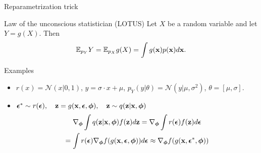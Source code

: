 \begin{frame}{Reparametrization trick}
	\begin{block}{Law of the unconscious statistician (LOTUS)}
		Let $X$ be a random variable and let $Y=g(X)$. Then
		\[
			\mathbb{E}_{p_Y} Y = \mathbb{E}_{p_X} g(X) = \int g(\mathbf{x}) p(\mathbf{x}) d \mathbf{x}.
		\]
		\vspace{-0.3cm}
	\end{block}
	\begin{block}{Examples} 
		\begin{itemize}
		\item $r(x) = \mathcal{N}(x|0, 1)$, $y = \sigma \cdot x + \mu$, $p_Y(y|\theta) = \mathcal{N}(y| \mu, \sigma^2)$, $\theta = [\mu, \sigma]$.

		\item $\boldsymbol{\epsilon}^* \sim r(\boldsymbol{\epsilon}), \quad \mathbf{z} = g(\mathbf{x}, \boldsymbol{\epsilon}, \boldsymbol{\phi}), \quad \mathbf{z} \sim q(\mathbf{z} | \mathbf{x}, \boldsymbol{\phi})$
		\begin{multline*}
			\nabla_{\boldsymbol{\phi}}\int q(\mathbf{z}|\mathbf{x}, \boldsymbol{\phi}) f(\mathbf{z}) d\mathbf{z} = \nabla_{\boldsymbol{\phi}}\int r(\boldsymbol{\epsilon})  f(\mathbf{z}) d\boldsymbol{\epsilon} \\ = \int r(\boldsymbol{\epsilon}) \nabla_{\boldsymbol{\phi}} f(g(\mathbf{x}, \boldsymbol{\epsilon}, \boldsymbol{\phi})) d\boldsymbol{\epsilon} \approx \nabla_{\boldsymbol{\phi}} f(g(\mathbf{x}, \boldsymbol{\epsilon}^*, \boldsymbol{\phi}))
		\end{multline*}
		\end{itemize}
	\end{block}
\end{frame}
